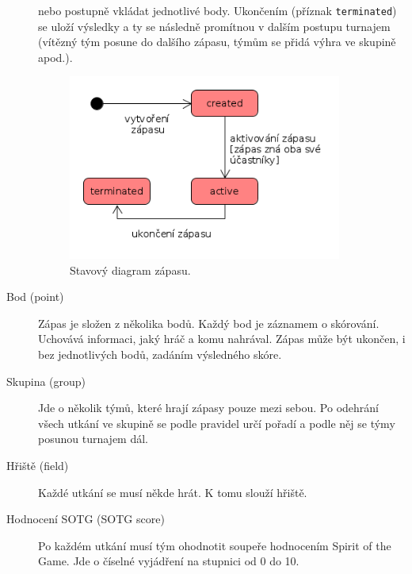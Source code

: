\begin{description}
    nebo postupně vkládat jednotlivé body. Ukončením (příznak \texttt{terminated}) se uloží výsledky a ty se následně promítnou
    v dalším postupu turnajem (vítězný tým posune do dalšího zápasu, týmům se přidá výhra ve skupině apod.).
    \begin{figure}[ht!]
      \centering
      \includegraphics[width=90mm]{./images/stavovy-diagram-zapas.png}
      \caption{Stavový diagram zápasu.\label{overflow}}
      \label{fig:state_match}
    \end{figure}
  \item[Bod (point)]
    Zápas je složen z několika bodů. Každý bod je záznamem o skórování. Uchovává informaci, jaký hráč a komu nahrával.
    Zápas může být ukončen, i bez jednotlivých bodů, zadáním výsledného skóre.
  \item[Skupina (group)]
    Jde o několik týmů, které hrají zápasy pouze mezi sebou. Po odehrání všech utkání ve skupině se podle pravidel určí pořadí a podle něj se týmy posunou turnajem dál.
  \item[Hřiště (field)]
    Každé utkání se musí někde hrát. K tomu slouží hřiště.
  \item[Hodnocení SOTG (SOTG score)]
    Po každém utkání musí tým ohodnotit soupeře hodnocením Spirit of the Game. Jde o číselné vyjádření na stupnici od 0 do 10.
\end{description}

